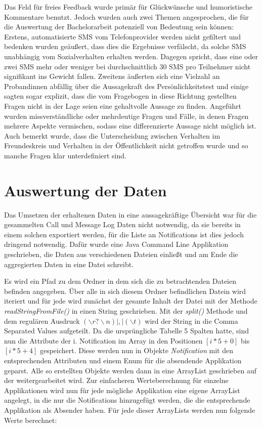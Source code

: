 Das Feld für freies Feedback wurde primär für Glückwünsche und humoristische Kommentare benutzt. 
Jedoch wurden auch zwei Themen angesprochen, die für die Auswertung der Bachelorarbeit potenziell von Bedeutung sein können:
Erstens, automatisierte SMS vom Telefonprovider werden nicht gefiltert und bedenken wurden geäußert, dass dies die Ergebnisse verfälscht, da solche SMS unabhängig vom Sozialverhalten erhalten werden.
Dagegen spricht, dass eine oder zwei SMS mehr oder weniger bei durchschnittlich 30 SMS pro Teilnehmer nicht signifikant ins Gewicht fallen.
Zweitens äußerten sich eine Vielzahl an Probandinnen abfällig über die Aussagekraft des Persönlichkeitstest und einige sagten sogar explizit, dass die vom Fragebogen in diese Richtung gestellten Fragen nicht in der Lage seien eine gehaltvolle Aussage zu finden.
Angeführt wurden missverständliche oder mehrdeutige Fragen und Fälle, in denen Fragen mehrere Aspekte vermischen, sodass eine differenzierte Aussage nicht möglich ist. 
Auch bemerkt wurde, dass die Unterscheidung zwischen Verhalten im Freundeskreis und Verhalten in der Öffentlichkeit nicht getroffen wurde und so manche Fragen klar unterdefiniert sind.

\section{Auswertung der Daten}

Das Umsetzen der erhaltenen Daten in eine aussagekräftige Übersicht war für die gesammelten Call und Message Log Daten nicht notwendig, da sie bereits in einem solchen exportiert werden, für die Liste an Notifications ist dies jedoch dringend notwendig.
Dafür wurde eine Java Command Line Applikation geschrieben, die Daten aus verschiedenen Dateien einließt und am Ende die aggregierten Daten in eine Datei schreibt.
\par
Es wird ein Pfad zu dem Ordner in dem sich die zu betrachtenden Dateien befinden angegeben.
Über alle in sich diesem Ordner befindlichen Datein wird iteriert und für jede wird zunächst der gesamte Inhalt der Datei mit der Methode \emph{readStringFromFile()} in einen String geschrieben.
Mit der \emph{split()} Methode und dem regulären Ausdruck  $(\backslash r?\backslash n)|,|(\backslash t)$ wird der String in die Comma Separated Values aufgeteilt.
Da die ursprüngliche Tabelle 5 Spalten hatte, sind nun die Attribute der i. Notification im Array in den Positionen $ [i * 5 + 0]$ bis $ [i * 5 + 4]$ gespeichert.
Diese werden nun in Objekte \emph{Notification} mit den entsprechenden Attributen und einem Enum für die absendende Applikation geparst.
Alle so erstellten Objekte werden dann in eine ArrayList geschrieben auf der weitergearbeitet wird.
Zur einfacheren Werteberechnung für einzelne Applikationen wird nun für jede mögliche Applikation eine eigene ArrayList angelegt, in die nur die Notifications hinzugefügt werden, die die entsprechende Applikation als Absender haben.
Für jede dieser ArrayLists werden nun folgende Werte berechnet:


